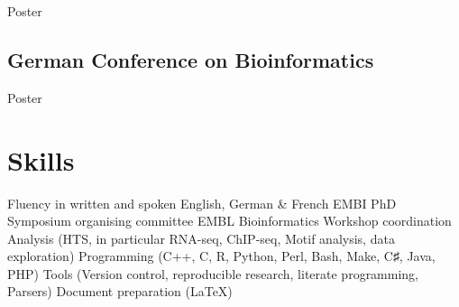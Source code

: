 \documentclass{klmr-cv}
\newcommand*\csharp{C♯}
\newcommand*\cpp{C++}
\begin{document}
\date{2013}
\item{Poster}

\subsection{German Conference on Bioinformatics}

\date{2009}
\item{Poster}

\section{Skills}

\begin{itemize}
    \listitem Fluency in written and spoken English, German \& French
    \listitem EMBI PhD Symposium organising committee
    \listitem EMBL Bioinformatics Workshop coordination
    \listitem Analysis (HTS, in particular RNA-seq, ChIP-seq, Motif analysis,
        data exploration)
    \listitem Programming (\cpp, C, R, Python, Perl, Bash, Make, \csharp, Java, PHP)
    \listitem Tools (Version control, reproducible research, literate
        programming, Parsers)
    \listitem Document preparation (\LaTeX)
\end{itemize}
\end{document}
